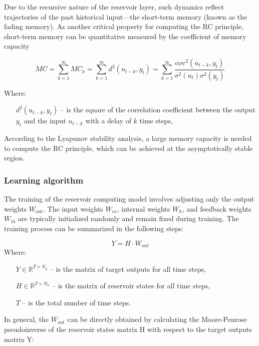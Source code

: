 \documentclass[11pt, oneside]{article}
\begin{document}
Due to the recursive nature of the reservoir layer,
such dynamics reflect trajectories of the past historical input—the short-term memory (known as the fading memory). As another critical property for computing the RC principle, short-term memory can be
quantitative measured by the coefficient of memory
capacity


\begin{equation}
    MC = \sum_{k=1}^{\infty} MC_k =
    \sum_{k=1}^{\infty} d^2(u_{t-k}, y_t) =  \sum_{k=1}^{\infty} \frac{\mathrm{cov}^2(u_{t-k}, y_t)}{\sigma^2(u_t) \sigma^2(y_t)}
\end{equation}

Where:
\begin{itemize}[noitemsep, leftmargin=4cm, label={}]
    \item [\(d^2(u_{t-k}, y_t)\)] -- is the square of the correlation coefficient between the output \(y_t\) and the input \(u_{t-k }\) with a delay of \(k\) time steps,
\end{itemize}

According to the Lyapunov stability analysis, a large memory capacity is needed to compute the RC principle, which can be achieved at the asymptotically stable region.


\subsubsection{Learning algorithm}
The training of the reservoir computing model involves adjusting only the output weights \(W_{\mathrm{out}}\). The input weights \(W_{in}\), internal weights \(W_h\), and feedback weights \(W_{1b}\) are typically initialized randomly and remain fixed during training. The training process can be summarized in the following steps:

\begin{equation}
    Y = H \cdot W_{out}
\end{equation}
Where:
\begin{itemize}[noitemsep, leftmargin=4cm, label={}]
    \item [\(Y \in \mathbb{R}^{T \times N_y}\)] -- is the matrix of target outputs for all time steps,
    \item [\(H \in \mathbb{R}^{T \times N_h}\)] -- is the matrix of reservoir states for all time steps,
    \item [\(T\)] -- is the total number of time steps.
\end{itemize}

In general, the \(W_{out}\) can be directly obtained by calculating the Moore-Penrose pseudoinverse of the reservoir states matrix H with respect to the target outputs matrix Y:
\end{document}
